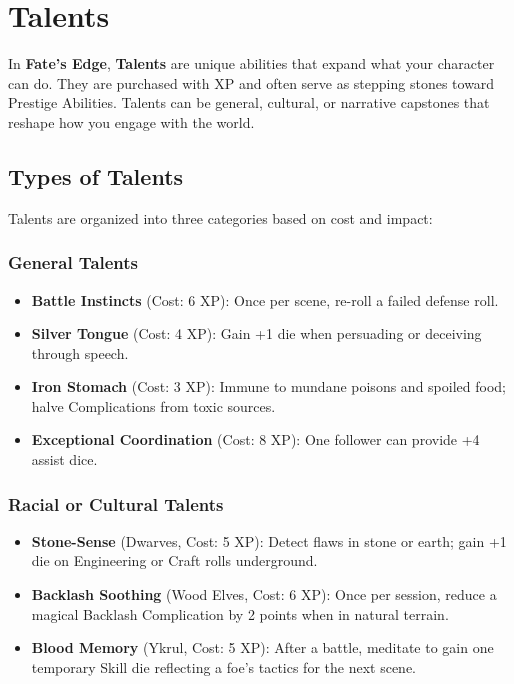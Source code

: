 
\chapter{Talents}
\label{ch:talents}

In \textbf{Fate's Edge}, \textbf{Talents}  are unique abilities that expand what your character can do. They are purchased with XP and often serve as stepping stones toward Prestige Abilities. Talents can be general, cultural, or narrative capstones that reshape how you engage with the world.

\section{Types of Talents}

Talents are organized into three categories based on cost and impact:

\subsection*{General Talents}

\begin{itemize}
    \item \textbf{Battle Instincts} (Cost: 6 XP): Once per scene, re-roll a failed defense roll.
    \item \textbf{Silver Tongue} (Cost: 4 XP): Gain +1 die when persuading or deceiving through speech.
    \item \textbf{Iron Stomach} (Cost: 3 XP): Immune to mundane poisons and spoiled food; halve Complications from toxic sources.
    \item \textbf{Exceptional Coordination} (Cost: 8 XP): One follower can provide +4 assist dice.
\end{itemize}

\subsection*{Racial or Cultural Talents}

\begin{itemize}
    \item \textbf{Stone-Sense} (Dwarves, Cost: 5 XP): Detect flaws in stone or earth; gain +1 die on Engineering or Craft rolls underground.
    \item \textbf{Backlash Soothing} (Wood Elves, Cost: 6 XP): Once per session, reduce a magical Backlash Complication by 2 points when in natural terrain.
    \item \textbf{Blood Memory} (Ykrul, Cost: 5 XP): After a battle, meditate to gain one temporary Skill die reflecting a foe's tactics for the next scene.
\end{itemize}

